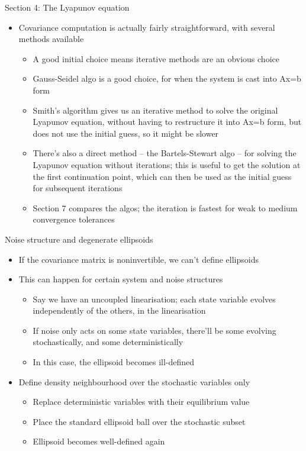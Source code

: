 \documentclass[presentation]{beamer}
\begin{document}
\begin{frame}[label={sec:org7fd8074},plain]{Section 4: The Lyapunov equation}
\vfill
\begin{itemize}
\item Covariance computation is actually fairly straightforward, with several methods available
\begin{itemize}
\item A good initial choice means iterative methods are an obvious choice
\item Gauss-Seidel algo is a good choice, for when the system is cast into Ax=b form
\item Smith's algorithm gives us an iterative method to solve the original Lyapunov equation, without having to restructure it into Ax=b form, but does not use the initial guess, so it might be slower
\item There's also a direct method -- the Bartels-Stewart algo -- for solving the Lyapunov equation without iterations; this is useful to get the solution at the first continuation point, which can then be used as the initial guess for subsequent iterations
\item Section 7 compares the algos; the iteration is fastest for weak to medium convergence tolerances
\end{itemize}
\end{itemize}
\end{frame}

\begin{frame}[label={sec:orgd49a2e5},plain]{Noise structure and degenerate ellipsoids}
\begin{itemize}
\item If the covariance matrix is noninvertible, we can't define ellipsoids
\end{itemize}
\vfill
\begin{itemize}
\item This can happen for certain system and noise structures
\begin{itemize}
\item Say we have an uncoupled linearisation; each state variable evolves independently of the others, in the linearisation
\item If noise only acts on some state variables, there'll be some evolving stochastically, and some deterministically
\item In this case, the ellipsoid becomes ill-defined
\end{itemize}
\end{itemize}
\vfill
\begin{itemize}
\item Define density neighbourhood over the stochastic variables only
\begin{itemize}
\item Replace deterministic variables with their equilibrium value
\item Place the standard ellipsoid ball over the stochastic subset
\item Ellipsoid becomes well-defined again
\end{itemize}
\end{itemize}
\end{frame}
\end{document}
